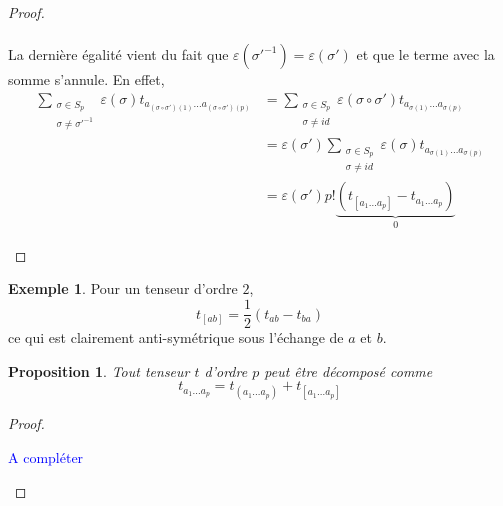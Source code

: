 \documentclass[a4paper,11pt]{report}
\theoremstyle{definition}
\theoremstyle{plain}
\newtheorem{prop}[thm]{Proposition}
\theoremstyle{definition}
\newtheorem{exmp}{Exemple}[chapter]
\theoremstyle{remark}
\newcommand{\comp}{\begin{center}\textcolor{blue}{A compléter}\end{center}}
\begin{document}
\begin{proof}
\begin{enumerate}[label = \textit{\roman*)}]
\begin{align}
                        \end{align}
                        La dernière égalité vient du fait que $ \varepsilon(\sigma'^{-1}) =  \varepsilon(\sigma')$ et que le terme avec la somme s'annule. En effet,
                        \begin{align}
                            \sum_{\substack{\sigma\in S_p\\\sigma\neq\sigma'^{-1}}} \varepsilon(\sigma) t_{a_{(\sigma\circ\sigma')(1)}\dots a_{(\sigma\circ\sigma')(p)}} 
                            &= \sum_{\substack{\sigma\in S_p\\\sigma\neq id}} \varepsilon(\sigma\circ\sigma') t_{a_{\sigma(1)}\dots a_{\sigma(p)}} \\
                            &= \varepsilon(\sigma')\sum_{\substack{\sigma\in S_p\\\sigma\neq id}} \varepsilon(\sigma) t_{a_{\sigma(1)}\dots a_{\sigma(p)}}\\
                            &= \varepsilon(\sigma') p!\underbrace{\left( t_{[a_1\dots a_p]}-t_{a_1\dots a_p} \right)}_{0}
                        \end{align}
                    \end{enumerate}
                \end{proof}
                
                \begin{exmp}
                    Pour un tenseur d'ordre $2$,
                    \begin{equation}
                        t_{[ab]} = \frac{1}{2}(t_{ab}-t_{ba})
                    \end{equation}
                    ce qui est clairement anti-symétrique sous l'échange de $a$ et $b$. 
                \end{exmp}
                
                \begin{prop}
                    Tout tenseur $t$ d'ordre $p$ peut être décomposé comme
                    \begin{equation}
                        t_{a_1\dots a_p} = t_{(a_1\dots a_p)} + t_{[a_1\dots a_p]}
                    \end{equation}
                \end{prop}
                
                \begin{proof}${}$\\
                    \comp
                \end{proof}
                
\end{document}
